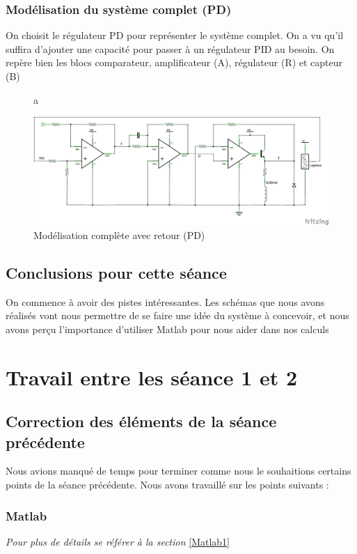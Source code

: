 \documentclass[11pt,a4paper]{article}
\begin{document}
\subsubsection{Modélisation du système complet (PD)}
\label{Modélisation complète}
On choisit le régulateur PD pour représenter le système complet. On a vu qu'il suffira d'ajouter une capacité pour passer à un régulateur PID au besoin. On repère bien les blocs comparateur, amplificateur (A), régulateur (R) et capteur (B)

\begin{figure} [H]a	
\begin{center}
\includegraphics[width=1\textwidth]{Schémas/Modèle complet PD.png} 
\end{center}
\caption{Modélisation complète avec retour (PD)}
\label{fig:Modélisation complète avec retour (PD)}
\end{figure}


\subsection{Conclusions pour cette séance}
On commence à avoir des pistes intéressantes. Les schémas que nous avons réalisés vont nous permettre de se faire une idée du système à concevoir, et nous avons perçu l'importance d'utiliser Matlab pour nous aider dans nos calculs

\section{Travail entre les séance 1 et 2}
\subsection{Correction des éléments de la séance précédente}
Nous avions manqué de temps pour terminer comme nous le souhaitions certains points de la séance précédente. Nous avons travaillé sur les points suivants :
\subsubsection{Matlab}
\textit{Pour plus de détails se référer à la section} \ref{Matlab1}\\
\end{document}

